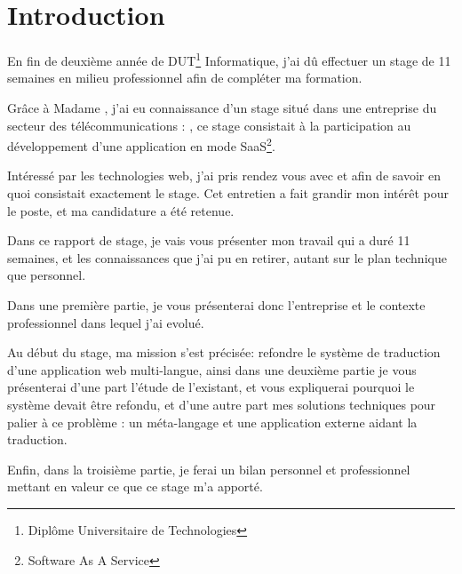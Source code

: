 \tableofcontents
\chapter*{Introduction}
En fin de deuxième année de DUT\footnote{Diplôme Universitaire de Technologies} Informatique, j'ai dû effectuer un stage de 11 semaines
en milieu professionnel afin de compléter ma formation.

Grâce à Madame , j'ai eu connaissance d'un stage situé dans une entreprise du secteur des télécommunications : \mbx{}, ce stage
consistait à la participation au développement d'une application en mode SaaS\footnote{Software As A Service}.

Intéressé par les technologies web, j'ai pris rendez vous avec \Denis{} et \Romain{} afin de savoir en quoi consistait exactement le stage. 
Cet entretien a fait grandir mon intérêt pour le poste, et ma candidature a été retenue.

Dans ce rapport de stage, je vais vous présenter mon travail qui a duré 11 semaines, et les connaissances que j'ai pu en retirer, autant sur le plan technique que personnel.

Dans une première partie, je vous présenterai donc l'entreprise et le contexte professionnel dans lequel j'ai evolué.

Au début du stage, ma mission s'est précisée: refondre le système de traduction d'une application web multi-langue, ainsi dans une deuxième partie je vous présenterai
d'une part l'étude de l'existant, et vous expliquerai pourquoi le système devait être refondu, et d'une autre part mes solutions techniques pour palier à ce problème : un méta-langage et une application externe aidant la traduction.

Enfin, dans la troisième partie, je ferai un bilan personnel et professionnel mettant en valeur ce que ce stage m'a apporté.
